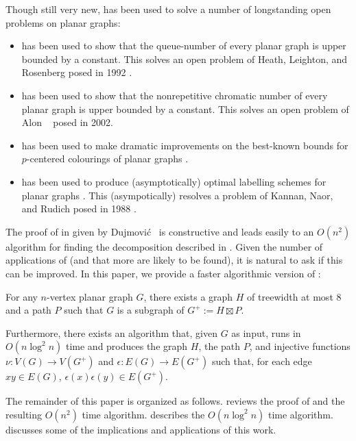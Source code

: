 \documentclass[kpfonts]{patmorin}
\begin{document}
Though still very new,  has been used to solve a number of longstanding open problems on planar graphs:
\begin{itemize}
  \item {} has been used to show that the queue-number of every planar graph is upper bounded by a constant.  This solves an open problem of Heath, Leighton, and Rosenberg posed in 1992 \cite{heath.leighton.ea:comparing}.
  \item {} has been used to show that the nonrepetitive chromatic number of every planar graph is upper bounded by a constant. This solves an open problem of Alon \etal\  \cite{alon.grytczuk.ea:nonrepetitive} posed in 2002.
  \item {} has been used to make dramatic improvements on the best-known bounds for $p$-centered colourings of planar graphs \cite{debski.felsner.ea:improved}.
  \item {} has been used to produce (asymptotically) optimal labelling schemes for planar graphs \cite{dujmovic.esperet.ea:adjacency}.  This (asympotically) resolves a problem of Kannan, Naor, and Rudich posed in 1988 \cite{kannan.naor.ea:implicit-stoc,kannan.naor.ea:implicit}.
\end{itemize}

The proof of  in given by Dujmović \etal\ is constructive and leads easily to an $O(n^2)$ algorithm for finding the decomposition described in  \cite[Section~10]{dujmovic.joret.ea:planar}. Given the number of applications of  (and that more are likely to be found), it is natural to ask if this can be improved.  In this paper, we provide a faster algorithmic version of :

\begin{thm}
  For any $n$-vertex planar graph $G$, there exists a graph $H$ of treewidth at most 8 and a path $P$ such that $G$ is a subgraph of $G^+:=H\boxtimes P$.

  Furthermore, there exists an algorithm that, given $G$ as input, runs in $O(n\log^2 n)$ time and produces the graph $H$, the path $P$, and injective functions $\nu:V(G)\to V(G^+)$ and $\epsilon:E(G)\to E(G^+)$ such that, for each edge $xy\in E(G)$,  $\epsilon(x)\epsilon(y)\in E(G^+)$.
\end{thm}

The remainder of this paper is organized as follows.  reviews the proof of  and the resulting $O(n^2)$ time algorithm.   describes the $O(n\log^2 n)$ time algorithm.   discusses some of the implications and applications of this work.
\end{document}
